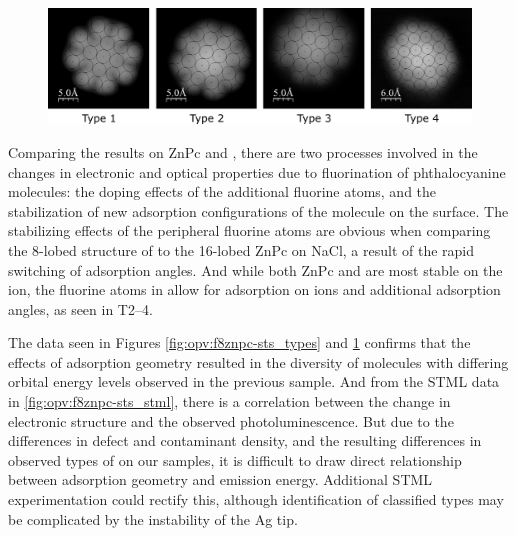 \begin{figure} [h]
    \centering
        \includegraphics[width=\textwidth]{pictures/4types_atomic.png}
    \caption{}
    \label{fig:opv:f8znpc-atomic_types}
\end{figure}


Comparing the results on ZnPc and , there are two processes involved in the changes in electronic and optical properties due to fluorination of phthalocyanine molecules: the doping effects of the additional fluorine atoms, and the stabilization of new adsorption configurations of the molecule on the surface. The stabilizing effects of the peripheral fluorine atoms are obvious when comparing the 8-lobed structure of  to the 16-lobed ZnPc on NaCl, a result of the rapid switching of adsorption angles. And while both ZnPc and  are most stable on the  ion, the fluorine atoms in  allow for adsorption on  ions and additional adsorption angles, as seen in T2--4.






The data seen in Figures \ref{fig:opv:f8znpc-sts_types} and \ref{fig:opv:f8znpc-atomic_types} confirms that the effects of adsorption geometry resulted in the diversity of molecules with differing orbital energy levels observed in the previous sample. And from the \ac{STML} data in \autoref{fig:opv:f8znpc-sts_stml}, there is a correlation between the change in electronic structure and the observed photoluminescence. But due to the differences in defect and contaminant density, and the resulting differences in observed types of  on our samples, it is difficult to draw direct relationship between adsorption geometry and emission energy. Additional \ac{STML} experimentation could rectify this, although identification of classified types may be complicated by the instability of the Ag tip.



